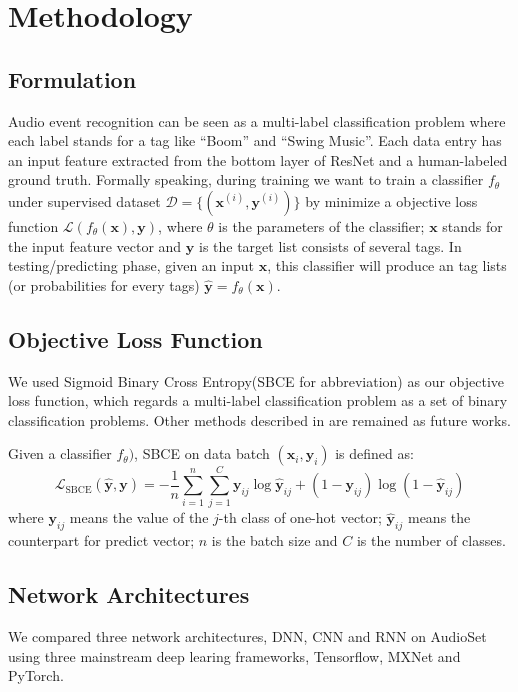 \documentclass{article}
\begin{document}
	\section{Methodology}\label{sec:method}
		\subsection{Formulation}\label{sec:formulate}
			Audio event recognition can be seen as a multi-label classification problem where each label stands for a tag like ``Boom'' and ``Swing Music''. Each data entry has an input feature extracted from the bottom layer of ResNet\cite{45857,DBLP:journals/corr/HeZRS15} and a human-labeled ground truth. Formally speaking, during training we want to train a classifier $f_\theta$ under supervised dataset $\mathcal{D}=\{(\mathbf{x}^{(i)}, \mathbf{y}^{(i)})\}$ by minimize a objective loss function $\mathcal{L}(f_\theta(\mathbf{x}), \mathbf{y})$, where $\theta$ is the parameters of the classifier; $\mathbf{x}$ stands for the input feature vector and $\mathbf{y}$ is the target list consists of several tags. In testing/predicting phase, given an input $\mathbf{x}$, this classifier will produce an tag lists (or probabilities for every tags) $\hat{\mathbf{y}} = f_\theta(\mathbf{x})$.

		\subsection{Objective Loss Function}
			We used Sigmoid Binary Cross Entropy(SBCE for abbreviation) as our objective loss function, which regards a multi-label classification problem as a set of binary classification problems. Other methods described in \cite{online:multilabel} are remained as future works. 

			Given a classifier $f_\theta)$, SBCE on data batch $(\mathbf{x}_i, \mathbf{y}_i)$ is defined as:
			\[\mathcal{L}_\mathrm{SBCE}(\hat{\mathbf{y}}, \mathbf{y}) = -\dfrac{1}{n}\sum_{i = 1}^n\sum_{j = 1}^{C} \mathbf{y}_{ij} \log{\hat{\mathbf{y}}_{ij}} + (1 - \mathbf{y}_{ij})\log{(1 - \hat{\mathbf{y}}_{ij})}\]
			where $\mathbf{y}_{ij}$ means the value of the $j$-th class of one-hot vector; $\mathbf{\hat{y}}_{ij}$ means the counterpart for predict vector; $n$ is the batch size and $C$ is the number of classes.

		\subsection{Network Architectures}
			We compared three network architectures, DNN, CNN and RNN on AudioSet using three mainstream deep learing frameworks, Tensorflow, MXNet and PyTorch.
\end{document}
